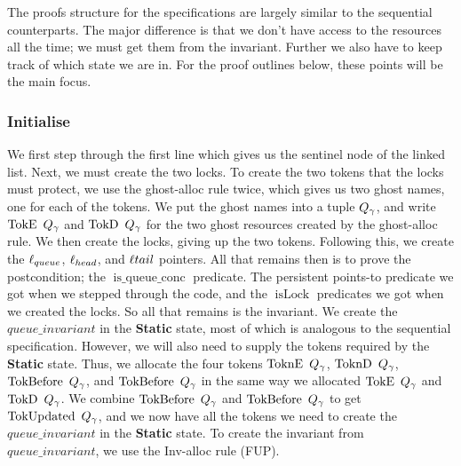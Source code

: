 \documentclass[twoside,11pt,openright]{report}
\newcommand{\isLock}{\operatorname{isLock}}
\newcommand{\isqueueconc}{\operatorname{is\_queue\_conc}}
\newcommand{\StaticState}{\textbf{Static}}
\newcommand{\Qg}{Q_\gname}
\newcommand{\TokE}[1]{\operatorname{TokE}\ #1}
\newcommand{\TokEQg}{\TokE{\Qg}}
\newcommand{\ToknE}[1]{\operatorname{ToknE}\ #1}
\newcommand{\ToknEQg}{\ToknE{\Qg}}
\newcommand{\TokD}[1]{\operatorname{TokD}\ #1}
\newcommand{\TokDQg}{\TokD{\Qg}}
\newcommand{\ToknD}[1]{\operatorname{ToknD}\ #1}
\newcommand{\ToknDQg}{\ToknD{\Qg}}
\newcommand{\TokBefore}[1]{\operatorname{TokBefore}\ #1}
\newcommand{\TokBeforeQg}{\TokBefore{\Qg}}
\newcommand{\TokAfterQg}{\TokBefore{\Qg}}
\newcommand{\TokUpdated}[1]{\operatorname{TokUpdated}\ #1}
\newcommand{\TokUpdatedQg}{\TokUpdated{\Qg}}
\begin{document}
The proofs structure for the specifications are largely similar to the sequential counterparts. The major difference is that we don't have access to the resources all the time; we must get them from the invariant. Further we also have to keep track of which state we are in. For the proof outlines below, these points will be the main focus.

\subsubsection{Initialise}
We first step through the first line which gives us the sentinel node of the linked list. Next, we must create the two locks. To create the two tokens that the locks must protect, we use the ghost-alloc rule twice, which gives us two ghost names, one for each of the tokens. We put the ghost names into a tuple $\Qg$, and write $\TokEQg$ and $\TokDQg$ for the two ghost resources created by the ghost-alloc rule. We then create the locks, giving up the two tokens. Following this, we create the $\ell_{queue}$, $\ell_{head}$, and $\ell{tail}$ pointers. All that remains then is to prove the postcondition; the $\isqueueconc$ predicate. The persistent points-to predicate we got when we stepped through the code, and the $\isLock$ predicates we got when we created the locks. So all that remains is the invariant. We create the $queue\_invariant$ in the \StaticState{} state, most of which is analogous to the sequential specification. However, we will also need to supply the tokens required by the \StaticState{} state. Thus, we allocate the four tokens $\ToknEQg$, $\ToknDQg$, $\TokBeforeQg$, and $\TokAfterQg$ in the same way we allocated $\TokEQg$ and $\TokDQg$. We combine $\TokBeforeQg$ and $\TokAfterQg$ to get $\TokUpdatedQg$, and we now have all the tokens we need to create the $queue\_invariant$ in the \StaticState{} state. To create the invariant from $queue\_invariant$, we use the Inv-alloc rule (FUP).
\end{document}
